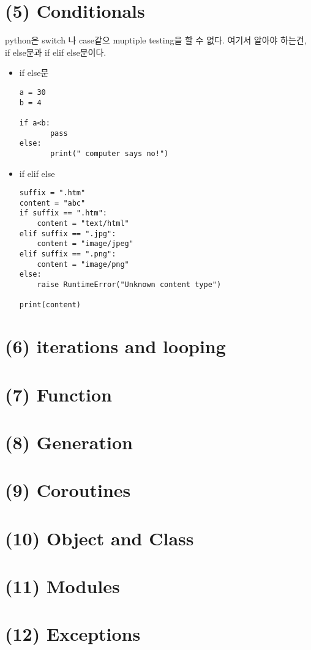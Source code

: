 \documentclass[11pt]{article}
\begin{document}
\section{(5) Conditionals}
\label{sec:orgb1966f6}
\begin{note}
python은 switch 나 case같으 muptiple testing을 할 수 없다. 여기서 알아야 하는건, if else문과 if elif else문이다.
\end{note}
\begin{itemize}
\item if else문
\begin{verbatim}
a = 30
b = 4

if a<b:
	   pass
else:
	   print(" computer says no!")

\end{verbatim}

\item if elif else
\begin{verbatim}
suffix = ".htm"
content = "abc"
if suffix == ".htm":
	content = "text/html"
elif suffix == ".jpg":
	content = "image/jpeg"
elif suffix == ".png":
	content = "image/png"
else:
	raise RuntimeError("Unknown content type")

print(content)
\end{verbatim}
\end{itemize}

\section{(6) iterations and looping}
\label{sec:org8284795}
\section{(7) Function}
\label{sec:org85eaec8}
\section{(8) Generation}
\label{sec:org2fba10f}
\section{(9) Coroutines}
\label{sec:org95bb517}
\section{(10) Object and Class}
\label{sec:org34ea690}
\section{(11) Modules}
\label{sec:org5be1b37}
\section{(12) Exceptions}
\label{sec:orga4bd925}
\end{document}
